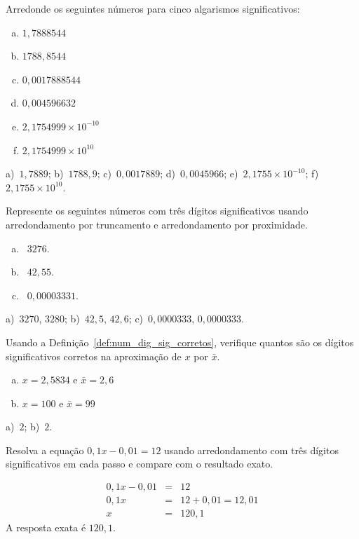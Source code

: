 \begin{exer} Arredonde os seguintes números para cinco algarismos significativos:
    \begin{enumerate}[a)]
    \item $1,7888544$
    \item $1788,8544$
    \item $0,0017888544$
    \item $0,004596632$
    \item $ 2,1754999\times 10^{-10}$
    \item $ 2,1754999\times 10^{10}$
    \end{enumerate}
\end{exer}
\begin{resp}
a)~$1,7889$; b)~$1788,9$; c)~$0,0017889$; d)~$0,0045966$; e)~$2,1755\times 10^{-10}$; f)~$2,1755\times 10^{10}$.
\end{resp}

\begin{exer}  Represente os seguintes números com três dígitos significativos usando arredondamento por truncamento e arredondamento por proximidade.
  \begin{enumerate}[a)]
  \item~$3276$.
  \item~$42,55$.
  \item~$0,00003331$.
  \end{enumerate}
\end{exer}
\begin{resp}
  a)~$3270$, $3280$; b)~$42,5$, $42,6$; c)~$0,0000333$, $0,0000333$.
\end{resp}

\begin{exer}
Usando a Definição~\ref{def:num_dig_sig_corretos}, verifique quantos são os dígitos significativos corretos na aproximação de $x$ por $\bar{x}$.
\begin{enumerate}[a)]
\item $x=2,5834$ e $\bar{x}=2,6$
\item $x=100$ e $\bar{x}=99$
\end{enumerate}
\end{exer}
\begin{resp}
  a)~$2$; b)~$2$.
\end{resp}

\begin{exer} Resolva a equação $0,1x-0,01=12$ usando arredondamento com três dígitos significativos em cada passo e compare com o resultado exato.
\end{exer}
\begin{resp}
 \begin{eqnarray*}
  0,1x-0,01&=&12\\
  0,1x&=&12+0,01=12,01\\
  x&=&120,1
 \end{eqnarray*}
A resposta exata é $120,1$.
\end{resp}


